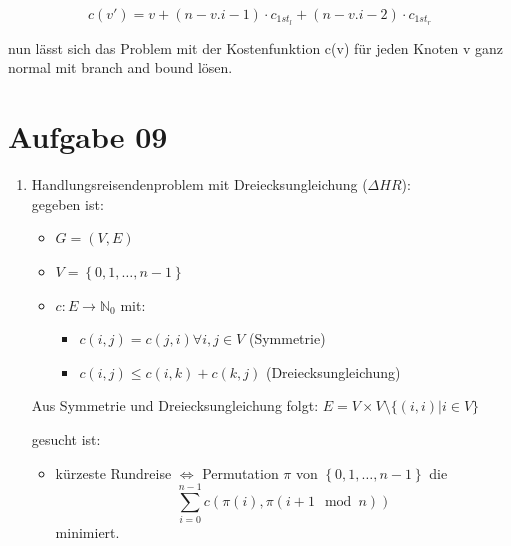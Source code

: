 \documentclass[10pt,a4paper]{article}
\begin{document}
    $$
        c(v') = v + (n-v.i-1) \cdot c_{1st_l} + (n-v.i-2) \cdot c_{1st_r}
    $$
    
    nun l\"asst sich das Problem mit der Kostenfunktion c(v) f\"ur jeden
    Knoten v ganz normal mit branch and bound l\"osen.


    
    
\section*{Aufgabe 09}
    \begin{enumerate}[label={\alph*)}]
        \item Handlungsreisendenproblem mit Dreiecksungleichung ($\Delta HR$): \\
            gegeben ist:
            \begin{itemize}
                \item $G = (V,E)$
                \item $V = \left\{0,1,\ldots, n-1\right\}$
                \item $c: E \rightarrow \mathbb{N}_0 $ mit:
                    \begin{itemize}
                        \item $c(i,j) = c(j,i) \forall i,j \in V$ (Symmetrie)
                        \item $c(i,j) \leq c(i,k) + c(k,j)$ (Dreiecksungleichung)
                    \end{itemize}

            \end{itemize}
            
            Aus Symmetrie und Dreiecksungleichung folgt: $E = V \times V
            \setminus \{ (i,i) | i \in V \} $
            
            gesucht ist:
            \begin{itemize}
                \item kürzeste Rundreise $\Leftrightarrow$ 
                    Permutation $\pi$ von $\left\{0,1,\ldots, n-1\right\}$ die
                    $$
                        \sum_{i=0}^{n-1} c(\pi(i), \pi(i+1 \mod n))
                    $$
                    minimiert.
            \end{itemize}
        

\end{enumerate}
\end{document}
